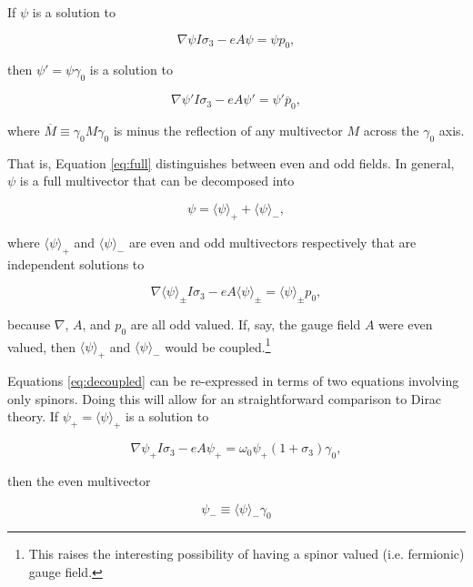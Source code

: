 \documentclass{article}
\begin{document}
  If $\psi$ is a solution to

  \begin{equation}
    \nabla \psi I \sigma_3 - e A \psi = \psi p_0,\label{eq:plus}
  \end{equation}

  then $\psi' = \psi \gamma_0$ is a solution to

  \begin{equation}
    \nabla \psi' I \sigma_3 - e A \psi' = \psi' \overline p_0, \label{eq:minus}
  \end{equation}

  where $\overline M \equiv \gamma_0 M\gamma_0$ is minus the reflection of any multivector $M$ across the $\gamma_0$ axis.

  That is, Equation \ref{eq:full} distinguishes between even and odd fields. In general, $\psi$ is a full multivector that can be decomposed into

  \begin{equation}
    \psi = \langle \psi \rangle_+ + \langle \psi \rangle_-,
  \end{equation}

  where $\langle \psi \rangle_+$ and $\langle \psi \rangle_-$ are even and odd multivectors respectively that are independent solutions to

  \begin{equation}
    \nabla \langle \psi \rangle_\pm I \sigma_3 - e A \langle \psi \rangle_\pm = \langle \psi \rangle_\pm p_0,\label{eq:decoupled}
  \end{equation}

  because $\nabla$, $A$, and $p_0$ are all odd valued. If, say, the gauge field $A$ were even valued, then $\langle \psi \rangle_+$ and $\langle \psi \rangle_-$ would be coupled.\footnote{This raises the interesting possibility of having a spinor valued (i.e. fermionic) gauge field.}

  Equations \ref{eq:decoupled} can be re-expressed in terms of two equations involving only spinors. Doing this will allow for an straightforward comparison to Dirac theory. If $\psi_+ = \langle \psi \rangle_+$ is a solution to

  \begin{equation}
    \nabla \psi_+ I \sigma_3 - e A \psi_+ = \omega_0 \psi_+ (1 + \sigma_3) \gamma_0,\label{eq:even}
  \end{equation}

  then the even multivector 

  \begin{equation}
    \psi_- \equiv \langle \psi \rangle_- \gamma_0\label{eq:0decomposition}
  \end{equation} 
\end{document}
